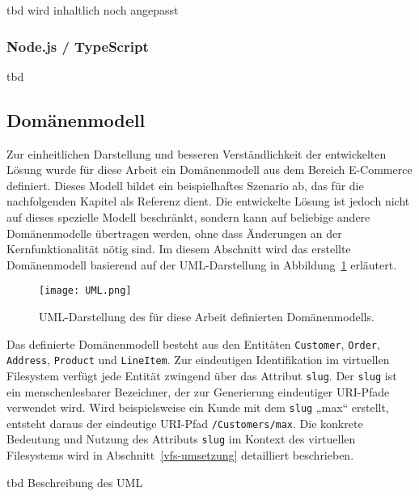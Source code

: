 tbd wird inhaltlich noch angepasst

\subsubsection*{Node.js / TypeScript}
tbd

\pagebreak

\subsection{Domänenmodell}
Zur einheitlichen Darstellung und besseren Verständlichkeit der entwickelten Lösung wurde für diese Arbeit ein Domänenmodell aus dem Bereich E-Commerce definiert. Dieses Modell bildet ein beispielhaftes Szenario ab, das für die nachfolgenden Kapitel als Referenz dient. Die entwickelte Lösung ist jedoch nicht auf dieses spezielle Modell beschränkt, sondern kann auf beliebige andere Domänenmodelle übertragen werden, ohne dass Änderungen an der Kernfunktionalität nötig sind. Im diesem Abschnitt wird das erstellte Domänenmodell basierend auf der UML-Darstellung in Abbildung~\ref{fig:uml_modell} erläutert.

\begin{figure}[H]
  \centering
  \texttt{[image: UML.png]}
  \caption{UML-Darstellung des für diese Arbeit definierten Domänenmodells.}
  \label{fig:uml_modell}
\end{figure}

Das definierte Domänenmodell besteht aus den Entitäten \texttt{Customer}, \texttt{Order}, \texttt{Address}, \texttt{Product} und \texttt{LineItem}. Zur eindeutigen Identifikation im virtuellen Filesystem verfügt jede Entität zwingend über das Attribut \texttt{slug}. Der \texttt{slug} ist ein menschenlesbarer Bezeichner, der zur Generierung eindeutiger URI-Pfade verwendet wird. Wird beispielsweise ein Kunde mit dem \texttt{slug} „max“ erstellt, entsteht daraus der eindeutige URI-Pfad \texttt{/Customers/max}. Die konkrete Bedeutung und Nutzung des Attributs \texttt{slug} im Kontext des virtuellen Filesystems wird in Abschnitt~\ref{vfs-umsetzung} detailliert beschrieben.

tbd Beschreibung des UML